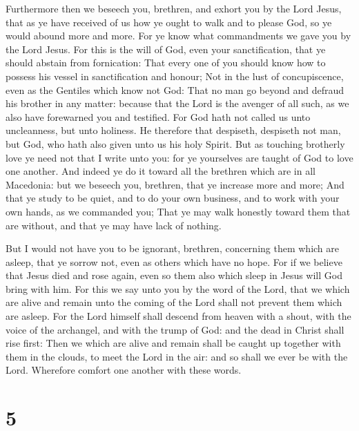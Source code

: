  Furthermore then we beseech you, brethren, and exhort you
by the Lord Jesus, that as ye have received of us how ye ought to walk
and to please God, so ye would abound more and more.  For
ye know what commandments we gave you by the Lord Jesus. 
For this is the will of God, even your sanctification, that ye should
abstain from fornication:  That every one of you should
know how to possess his vessel in sanctification and honour;
 Not in the lust of concupiscence, even as the Gentiles
which know not God:  That no man go beyond and defraud his
brother in any matter: because that the Lord is the avenger of all such,
as we also have forewarned you and testified.  For God
hath not called us unto uncleanness, but unto holiness. 
He therefore that despiseth, despiseth not man, but God, who hath also
given unto us his holy Spirit.  But as touching brotherly
love ye need not that I write unto you: for ye yourselves are taught of
God to love one another.  And indeed ye do it toward all
the brethren which are in all Macedonia: but we beseech you, brethren,
that ye increase more and more;  And that ye study to be
quiet, and to do your own business, and to work with your own hands, as
we commanded you;  That ye may walk honestly toward them
that are without, and that ye may have lack of nothing.

 But I would not have you to be ignorant, brethren,
concerning them which are asleep, that ye sorrow not, even as others
which have no hope.  For if we believe that Jesus died
and rose again, even so them also which sleep in Jesus will God bring
with him.  For this we say unto you by the word of the
Lord, that we which are alive and remain unto the coming of the Lord
shall not prevent them which are asleep.  For the Lord
himself shall descend from heaven with a shout, with the voice of the
archangel, and with the trump of God: and the dead in Christ shall rise
first:  Then we which are alive and remain shall be
caught up together with them in the clouds, to meet the Lord in the air:
and so shall we ever be with the Lord.  Wherefore comfort
one another with these words.

\hypertarget{section-4}{%
\section{5}\label{section-4}}

